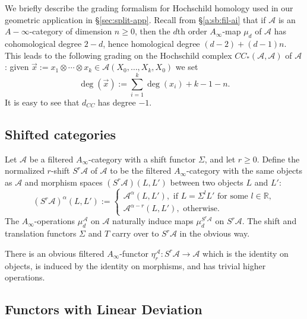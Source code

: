 We briefly describe the grading formalism for Hochschild homology used in our geometric application in \S\ref{sec:split-app}. 
Recall from \S\ref{a:sb:fil-ai} that if $\mathcal{A}$ is an $A-\infty$-category of dimension $n\geq 0$, then the $d$th order $A_\infty$-map $\mu_d$ of $\mathcal{A}$ has cohomological degree $2-d$, hence homological degree $(d-2)+(d-1)n$. This leads to the following grading on the Hochschild complex $CC_*(\mathcal{A},\mathcal{A})$ of $\mathcal{A}$: given $\vec{x}:=x_1\otimes \cdots \otimes x_k\in \mathcal{A}(X_0,\ldots,X_k,X_0)$ we set $$\deg(\vec{x}):= \sum_{i=1}^k \deg(x_i)+k-1-n.$$ It is easy to see that $d_{CC}$ has degree $-1$.


\subsection{Shifted categories} \label{a:shifted} Let $\mathcal{A}$ be
a filtered $A_{\infty}$-category with a shift functor $\Sigma$, and
let $r \geq 0$. Define the normalized $r$-shift $S^r \mathcal{A}$ of
$\mathcal{A}$ to be the filtered $A_{\infty}$-category with the same
objects as $\mathcal{A}$ and morphism spaces $(S^r\mathcal{A})(L,L')$
between two objects $L$ and $L'$:
$$(S^r \mathcal{A})^{\alpha}(L,L'):=
\begin{cases} \mathcal{A}^{\alpha}(L,L'), \text{ if } L=\Sigma^lL'
  \text{ for some } l\in \mathbb R, \\ \mathcal{A}^{\alpha - r}
  (L,L'), \text{ otherwise.}
\end{cases}
$$
The $A_{\infty}$-operations $\mu^{\mathcal{A}}_d$ on $\mathcal{A}$
naturally induce maps $\mu^{S^r \mathcal{A}}_d$ on $S^r
\mathcal{A}$. The shift and translation functors $\Sigma$ and $T$
carry over to $S^r \mathcal{A}$ in the obvious way.

There is an obvious filtered $A_\infty$-functor
$\eta_r^{\mathcal{A}} : S^r \mathcal{A} \longrightarrow \mathcal{A}$
which is the identity on objects, is induced by the identity on
morphisms, and has trivial higher operations.



\subsection{Functors with Linear Deviation} \label{a:func-LD}

